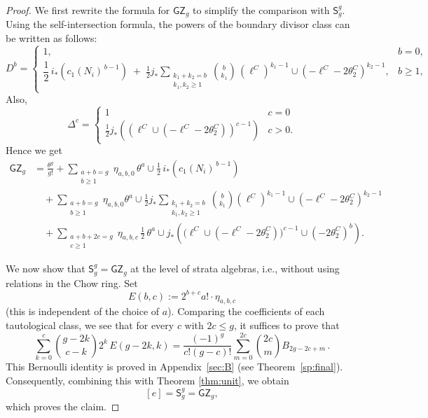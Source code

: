 \documentclass[11pt]{article}
\newcommand{\sfS}{\mathsf{S}}
\theoremstyle{definition}
\begin{document}
\begin{proof}
    We first rewrite the formula for $\mathsf{GZ}_g$ to simplify the comparison with $\sfS^g_g$. Using the self-intersection formula, the powers of the boundary divisor class can be written as follows:
    \[
    D^b =
    \begin{cases}
    1, & b=0, \\[4pt]
    \dfrac{1}{2}\, i_*(c_1(N_i)^{\,b-1})
    \;+\;\frac{1}{2}
    j_* \displaystyle\sum_{\substack{k_1+k_2=b \\ k_1,k_2\ge 1}}
    \binom{b}{k_1}
    \,(\ell^C)^{k_1-1}\cup(-\ell^C-2\theta_2^C)^{k_2-1},
    & b\ge 1,
    \end{cases}
    \]
    Also,
    \[
    \Delta^c = \begin{cases}
        1 & c=0\\
        \frac{1}{2} j_*\left((\ell^C\cup(-\ell^C-2\theta_2^C))^{c-1}\right) & c>0.
    \end{cases}
    \]
	Hence we get
    \begin{align*}
    \mathsf{GZ}_g
    &=
    \frac{\theta^g}{g!}
    +
    \sum_{\substack{a+b=g \\ b\ge 1}}
    \eta_{a,b,0}\,
    \theta^a \cup
    \frac{1}{2}\,
    i_*\!\left( c_1(N_i)^{\,b-1} \right)
    \nonumber \\
    &\quad + \sum_{\substack{a+b=g \\ b\ge 1}} \eta_{a,b,0} \theta^a\cup
    \frac{1}{2}
    j_*\sum_{\substack{k_1+k_2=b\\k_1,k_2\ge 1}} \binom{b}{k_1}(\ell^C)^{k_1-1}\cup(-\ell^C-2\theta_2^C)^{k_2-1}\nonumber\\
    &\quad+
    \sum_{\substack{a+b+2c=g \\ c\ge 1}}
    \eta_{a,b,c}\,
    \frac{1}{2}\,\theta^a\cup
    j_*\!\left(
    \bigl(\ell^C\cup(-\ell^C-2\theta_2^C)\bigr)^{c-1}
    \cup
    (-2\theta_2^C)^b
    \right).
    \end{align*}

    We now show that $\sfS^g_g = \mathsf{GZ}_g$ at the level of strata algebras, i.e., without using relations in the Chow ring. Set
    \begin{equation}\label{eq:E}
        E(b,c) := 2^{b+c} a!\cdot \eta_{a,b,c}
    \end{equation}
	(this is independent of the choice of $a$). Comparing the coefficients of each tautological class, we see that for every $c$ with $2c \le g$, it suffices to prove that
    \[
    \sum_{k=0}^c
    \binom{g-2k}{c-k}
    2^{k}\,E(g-2k,k)
    =
    \frac{(-1)^g}{c!(g-c)!}
    \sum_{m=0}^{2c}
    \binom{2c}{m}
    B_{2g-2c+m}\,.
    \]
    This Bernoulli identity is proved in Appendix~\ref{sec:B} (see Theorem~\ref{sp:final}). Consequently, combining this with Theorem \ref{thm:unit}, we obtain
    \[
    [e] = \sfS^g_g = \mathsf{GZ}_g,
    \]
    which proves the claim.
\end{proof}
\end{document}

